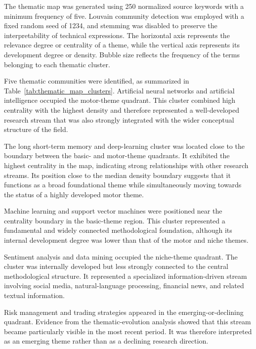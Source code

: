 \documentclass[pdflatex,sn-mathphys-num]{sn-jnl}%
\theoremstyle{thmstyleone}%
\theoremstyle{thmstyletwo}%
\theoremstyle{thmstylethree}%
\begin{document}
The thematic map was generated using 250 normalized source keywords with a
minimum frequency of five. Louvain community detection was employed with a
fixed random seed of 1234, and stemming was disabled to preserve the
interpretability of technical expressions. The horizontal axis represents
the relevance degree or centrality of a theme, while the vertical axis
represents its development degree or density. Bubble size reflects the
frequency of the terms belonging to each thematic cluster.

Five thematic communities were identified, as summarized in
Table~\ref{tab:thematic_map_clusters}. Artificial neural networks and
artificial intelligence occupied the motor-theme quadrant. This cluster
combined high centrality with the highest density and therefore represented
a well-developed research stream that was also strongly integrated with the
wider conceptual structure of the field.

The long short-term memory and deep-learning cluster was located close to
the boundary between the basic- and motor-theme quadrants. It exhibited the
highest centrality in the map, indicating strong relationships with other
research streams. Its position close to the median density boundary suggests
that it functions as a broad foundational theme while simultaneously moving
towards the status of a highly developed motor theme.

Machine learning and support vector machines were positioned near the
centrality boundary in the basic-theme region. This cluster represented a
fundamental and widely connected methodological foundation, although its
internal development degree was lower than that of the motor and niche
themes.

Sentiment analysis and data mining occupied the niche-theme quadrant. The
cluster was internally developed but less strongly connected to the central
methodological structure. It represented a specialized information-driven
stream involving social media, natural-language processing, financial news,
and related textual information.

Risk management and trading strategies appeared in the
emerging-or-declining quadrant. Evidence from the thematic-evolution
analysis showed that this stream became particularly visible in the most
recent period. It was therefore interpreted as an emerging theme rather
than as a declining research direction.
\end{document}
